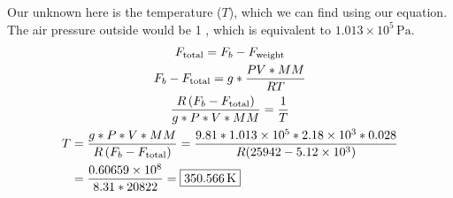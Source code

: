 \documentclass[12pt]{article}
\newcommand{\E}[1]{\times 10^{#1}}
\begin{document}
            Our unknown here is the temperature ($T$), which we can find using our equation.
            The air pressure outside would be 1 \unit{\atm}, which is equivalent to $1.013\E{5}\,\unit{\pascal}$.
            \begin{gather}
                F_{\rm total}   =   F_b - F_{\rm weight}\\
                F_b - F_{\rm total} =   g * \frac{PV * MM}{RT}\\
                \frac{R\left( F_b - F_{\rm total} \right)}{g * P * V * MM}  =   \frac{1}{T}\\
                \begin{align}
                    T   &=  \frac{g * P * V * MM}{R\left( F_b - F_{\rm total} \right)}
                        =   \frac{9.81 * 1.013\E{5} * 2.18\E{3} * 0.028}{R(25942 - 5.12\E{3})}\\
                        &=  \frac{0.60659\E{8}}{8.31 * 20822}
                        =   \boxed{350.566\,\unit{\kelvin}}
                \end{align}
            \end{gather}




\end{document}
